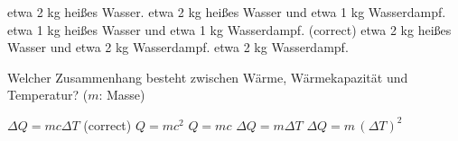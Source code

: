 \documentclass[11pt]{exam}
\begin{document}
\begin{questions}
\begin{choices}
	\choice etwa 2 kg heißes Wasser.
	\choice etwa 2 kg heißes Wasser und etwa 1 kg Wasserdampf.
	\choice etwa 1 kg heißes Wasser und etwa 1 kg Wasserdampf. (correct)
	\choice etwa 2 kg heißes Wasser und etwa 2 kg Wasserdampf.
	\choice etwa 2 kg Wasserdampf.
\end{choices}

\vspace{3mm}\question Welcher Zusammenhang besteht zwischen Wärme, Wärmekapazität und Temperatur? (\(m\): Masse)

\begin{choices}
	\choice \(\Delta Q = m c \Delta T\) (correct)
	\choice \(Q = m c^2\)
	\choice \(Q = m c\)
	\choice \(\Delta Q = m \Delta T\)
	\choice \(\Delta Q = m \, (\Delta T)^2\)
\end{choices}

\vspace{3mm}\end{questions}
\end{document}
